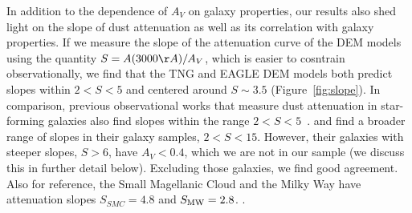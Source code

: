 In addition to the dependence of $A_V$ on galaxy properties, our results also
shed light on the slope of dust attenuation as well as its correlation with 
galaxy properties. If we measure the slope of the attenuation curve of the DEM
models using the quantity $S = A(3000\AA)/A_V$, which is easier to cosntrain 
observationally, we find that the TNG and EAGLE DEM models both predict
slopes within $2 < S < 5$ and centered around $S\sim 3.5$ (Figure~\ref{fig:slope}).
In comparison, previous observational works that measure dust attenuation in
star-forming galaxies also find slopes within the range $2 < S <
5$~\citep{calzetti2000, burgarella2005, johnson2007, conroy2010, wild2011,
battisti2016, battisti2017}. \cite{leja2017} and \cite{salim2018} find a
broader range of slopes in their galaxy samples, $2 < S < 15$. However,
their galaxies with steeper slopes, $S > 6$, have $A_V < 0.4$, which we are not
in our sample (we discuss this in further detail below). Excluding those
galaxies, we find good agreement. Also for reference, the Small Magellanic Cloud 
and the Milky Way have attenuation slopes $S_{SMC} = 4.8$ and $S_{\rm MW} = 2.8$. 
. 


